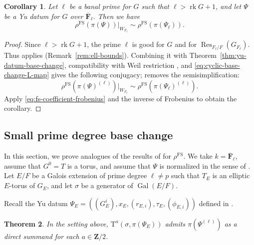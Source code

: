 \documentclass[reqno]{amsart}
\numberwithin{equation}{subsection}
\newcommand{\F}{\mathbf{F}}
\newcommand{\Z}{\mathbf{Z}}
\newcommand{\Gal}{\operatorname{Gal}}
\newcommand{\ol}[1]{\overline{#1}}
\DeclareMathOperator{\Res}{Res}
\DeclareMathOperator{\FS}{FS}
\DeclareMathOperator{\rk}{rk}
\newcommand{\rT}{\ensuremath{\mathrm{T}}\xspace}
\newtheorem{thm}{Theorem}[subsection]
\newtheorem{cor}[thm]{Corollary}
\theoremstyle{remark}
\numberwithin{equation}{subsection}
\numberwithin{figure}{subsection}
\begin{document}
\begin{cor}\label{cor:yu-datum-base-change-parameter}
Let $\ell$ be a banal prime for $G$ such that $\ell > \rk G + 1$, and let $\Psi$ be a Yu datum for $G$ over $\ol\F_\ell$. Then we have 
\[
\rho^{\FS}(\pi(\Psi))|_{W_{F_\ell}} \sim \rho^{\FS}(\pi(\Psi_\ell)).
\]
\end{cor}

\begin{proof}
Since $\ell>\rk G+1$, the prime $\ell$ is good for $G$ and for $\Res_{F_\ell/F}(G_{F_\ell})$. Thus \cite[Theorem 1.3.1]{F24} applies (Remark~\ref{rem:ell-bounds}). Combining it with Theorem~\ref{thm:yu-datum-base-change}, compatibility with Weil restriction \cite[Theorem I.9.6(vii)]{FS}, and \eqref{eq:cyclic-base-change-L-map} gives the following conjugacy; \cite[Lemma~10.1.6(1)]{CF26a} removes the semisimplification:
\[
\rho^{\FS}(\pi(\Psi)^{(\ell)})|_{W_{F_\ell}}
\sim\rho^{\FS}(\pi(\Psi_\ell)^{(\ell)}).
\]
Apply \eqref{eq:fs-coefficient-frobenius} and the inverse of Frobenius to obtain the corollary. 
\end{proof}


\subsection{Small prime degree base change}\label{ss:yu-low-deg-bc}

In this section, we prove analogues of the results of \cite[\S 8.3]{CF26a} for $\rho^{\FS}$. We take $k = \ol\F_\ell$, assume that $G^0 = T$ is a torus, and assume that $\Psi$ is normalized in the sense of \cite[Definition 3.7.1]{Kal19}. Let $E/F$ be a Galois extension of prime degree $\ell \neq p$ such that $T_E$ is an elliptic $E$-torus of $G_E$, and let $\sigma$ be a generator of $\Gal(E/F)$.

Recall the Yu datum $\Psi_E=((G_E^i),x_E,(r_{E,i}),\tau_E,(\phi_{E,i}))$ defined in \cite[\S 8.3]{CF26a}.

\begin{thm}\label{thm:yu-datum-small-degree-bc}
In the setting above, $\rT^a(\sigma,\pi(\Psi_E))$ admits $\pi(\Psi^{(\ell)})$ as a direct summand for each $a\in\Z/2$.
\end{thm}
\end{document}
